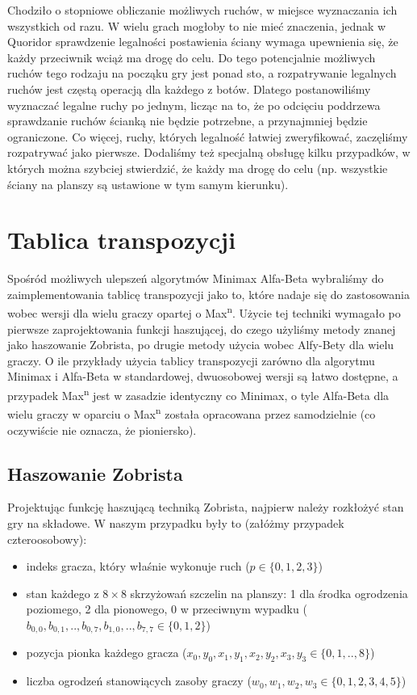 \documentclass{pracamgr}
\begin{document}
Chodziło o stopniowe obliczanie możliwych ruchów, w miejsce wyznaczania ich wszystkich od razu.
W wielu grach mogłoby to nie mieć znaczenia, jednak w Quoridor sprawdzenie legalności postawienia ściany wymaga upewnienia się, że każdy przeciwnik wciąż ma drogę do celu.
Do tego potencjalnie możliwych ruchów tego rodzaju na począku gry jest ponad sto, a rozpatrywanie legalnych ruchów jest częstą operacją dla każdego z botów.
Dlatego postanowiliśmy wyznaczać legalne ruchy po jednym, licząc na to, że po odcięciu poddrzewa sprawdzanie ruchów ścianką nie będzie potrzebne, a przynajmniej będzie ograniczone.
Co więcej, ruchy, których legalność łatwiej zweryfikować, zaczęliśmy rozpatrywać jako pierwsze.
Dodaliśmy też specjalną obsługę kilku przypadków, w których można szybciej stwierdzić, że każdy ma drogę do celu (np. wszystkie ściany na planszy są ustawione w tym samym kierunku).

\section{Tablica transpozycji}

Spośród możliwych ulepszeń algorytmów Minimax Alfa-Beta wybraliśmy do zaimplementowania tablicę transpozycji jako to, które nadaje się do zastosowania wobec wersji dla wielu graczy opartej o Max\textsuperscript{n}.
Użycie tej techniki wymagało po pierwsze zaprojektowania funkcji haszującej, do czego użyliśmy metody znanej jako haszowanie Zobrista, po drugie metody użycia wobec Alfy-Bety dla wielu graczy.
O ile przykłady użycia tablicy transpozycji zarówno dla algorytmu Minimax i Alfa-Beta w standardowej, dwuosobowej wersji są łatwo dostępne, a przypadek Max\textsuperscript{n} jest w zasadzie identyczny co Minimax, o tyle Alfa-Beta dla wielu graczy w oparciu o Max\textsuperscript{n} została opracowana przez samodzielnie (co oczywiście nie oznacza, że pioniersko).

\subsection{Haszowanie Zobrista}

Projektując funkcję haszującą techniką Zobrista, najpierw należy rozkłożyć stan gry na składowe.
W naszym przypadku były to (załóżmy przypadek czteroosobowy):

\begin{itemize}
\item indeks gracza, który właśnie wykonuje ruch (\(p \in \{0, 1, 2, 3\}\))
\item stan każdego z \(8 \times 8\) skrzyżowań szczelin na planszy: 1 dla środka ogrodzenia poziomego, 2 dla pionowego, 0 w przeciwnym wypadku (\( b_{0, 0}, b_{0, 1}, .., b_{0, 7}, b_{1, 0}, .., b_{7, 7} \in \{0, 1, 2\}\))
\item pozycja pionka każdego gracza (\(x_0, y_0, x_1, y_1, x_2, y_2, x_3, y_3 \in \{0, 1, .., 8\}\))
\item liczba ogrodzeń stanowiących zasoby graczy (\(w_0, w_1, w_2, w_3 \in \{0, 1, 2, 3, 4, 5\}\))
\end {itemize}
\end{document}
